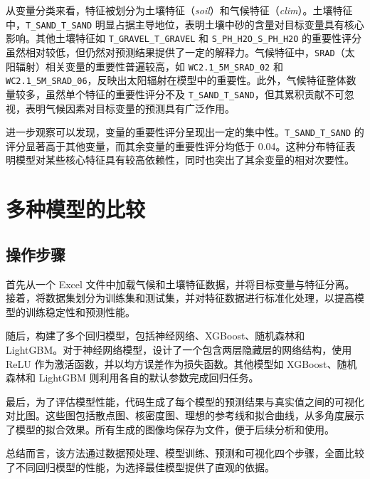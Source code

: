\documentclass[AutoFakeBold]{LZUThesis-PgD&PhD}
\begin{document}
从变量分类来看，特征被划分为土壤特征（\textit{soil}）和气候特征（\textit{clim}）。土壤特征中，\texttt{T\_SAND\_T\_SAND} 明显占据主导地位，表明土壤中砂的含量对目标变量具有核心影响。其他土壤特征如 \texttt{T\_GRAVEL\_T\_GRAVEL} 和 \texttt{S\_PH\_H2O\_S\_PH\_H2O} 的重要性评分虽然相对较低，但仍然对预测结果提供了一定的解释力。气候特征中，\texttt{SRAD}（太阳辐射）相关变量的重要性普遍较高，如 \texttt{WC2.1\_5M\_SRAD\_02} 和 \texttt{WC2.1\_5M\_SRAD\_06}，反映出太阳辐射在模型中的重要性。此外，气候特征整体数量较多，虽然单个特征的重要性评分不及 \texttt{T\_SAND\_T\_SAND}，但其累积贡献不可忽视，表明气候因素对目标变量的预测具有广泛作用。

进一步观察可以发现，变量的重要性评分呈现出一定的集中性。\texttt{T\_SAND\_T\_SAND} 的评分显著高于其他变量，而其余变量的重要性评分均低于 0.04。这种分布特征表明模型对某些核心特征具有较高依赖性，同时也突出了其余变量的相对次要性。


\section{多种模型的比较}
	            
	\subsection{操作步骤}

	
	首先从一个 Excel 文件中加载气候和土壤特征数据，并将目标变量与特征分离。接着，将数据集划分为训练集和测试集，并对特征数据进行标准化处理，以提高模型的训练稳定性和预测性能。
	
	随后，构建了多个回归模型，包括神经网络、XGBoost、随机森林和 LightGBM。对于神经网络模型，设计了一个包含两层隐藏层的网络结构，使用 ReLU 作为激活函数，并以均方误差作为损失函数。其他模型如 XGBoost、随机森林和 LightGBM 则利用各自的默认参数完成回归任务。
	
	最后，为了评估模型性能，代码生成了每个模型的预测结果与真实值之间的可视化对比图。这些图包括散点图、核密度图、理想的参考线和拟合曲线，从多角度展示了模型的拟合效果。所有生成的图像均保存为文件，便于后续分析和使用。
	
	总结而言，该方法通过数据预处理、模型训练、预测和可视化四个步骤，全面比较了不同回归模型的性能，为选择最佳模型提供了直观的依据。
	
	
	
\end{document}
